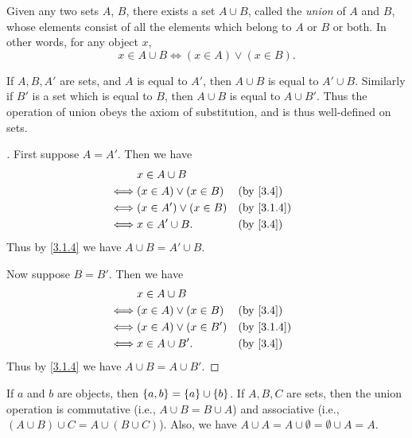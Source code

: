 \begin{ax}\label{3.4}
  Given any two sets \(A\), \(B\), there exists a set \(A \cup B\), called the \emph{union} of \(A\) and \(B\), whose elements consist of all the elements which belong to \(A\) or \(B\) or both.
  In other words, for any object \(x\),
  \[
    x \in A \cup B \iff (x \in A) \lor (x \in B).
  \]
\end{ax}

\setcounter{thm}{11}
\begin{rmk}\label{3.1.12}
  If \(A, B, A'\) are sets, and \(A\) is equal to \(A'\), then \(A \cup B\) is equal to \(A' \cup B\).
  Similarly if \(B'\) is a set which is equal to \(B\), then \(A \cup B\) is equal to \(A \cup B'\).
  Thus the operation of union obeys the axiom of substitution, and is thus well-defined on sets.
\end{rmk}

\begin{proof}[]
  First suppose \(A = A'\).
  Then we have
  \begin{align*}
         & x \in A \cup B                            \\
    \iff & (x \in A) \lor (x \in B)  &  & \by{3.4}   \\
    \iff & (x \in A') \lor (x \in B) &  & \by{3.1.4} \\
    \iff & x \in A' \cup B.          &  & \by{3.4}
  \end{align*}
  Thus by \cref{3.1.4} we have \(A \cup B = A' \cup B\).

  Now suppose \(B = B'\).
  Then we have
  \begin{align*}
         & x \in A \cup B                            \\
    \iff & (x \in A) \lor (x \in B)  &  & \by{3.4}   \\
    \iff & (x \in A) \lor (x \in B') &  & \by{3.1.4} \\
    \iff & x \in A \cup B'.          &  & \by{3.4}
  \end{align*}
  Thus by \cref{3.1.4} we have \(A \cup B = A \cup B'\).
\end{proof}

\begin{lem}\label{3.1.13}
  If \(a\) and \(b\) are objects, then \(\left\lbrace a, b\right\rbrace = \left\lbrace a\right\rbrace \cup \left\lbrace b\right\rbrace\).
  If \(A, B, C\) are sets, then the union operation is commutative (i.e., \(A \cup B = B \cup A\)) and associative (i.e., \((A \cup B) \cup C = A \cup (B \cup C)\)).
  Also, we have \(A \cup A = A \cup \emptyset = \emptyset \cup A = A\).
\end{lem}

